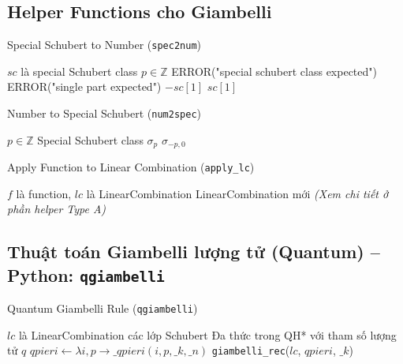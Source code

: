 \subsection*{Helper Functions cho Giambelli}

\begin{algorithm}[H]
\caption{Special Schubert to Number (\texttt{spec2num})}
\begin{algorithmic}[1]
\REQUIRE $sc$ là special Schubert class
\ENSURE $p \in \mathbb{Z}$
    \STATE ERROR("special schubert class expected")
\ENDIF
{}
    \STATE ERROR("single part expected")
\ENDIF
{}
    \RETURN $-sc[1]$
\ELSE
    \RETURN $sc[1]$
\ENDIF
\end{algorithmic}
\end{algorithm}

\begin{algorithm}[H]
\caption{Number to Special Schubert (\texttt{num2spec})}
\begin{algorithmic}[1]
\REQUIRE $p \in \mathbb{Z}$
\ENSURE Special Schubert class
    \RETURN $\sigma_p$
\ELSE
    \RETURN $\sigma_{-p,0}$
\ENDIF
\end{algorithmic}
\end{algorithm}

\begin{algorithm}[H]
\caption{Apply Function to Linear Combination (\texttt{apply\_lc})}
\begin{algorithmic}[1]
\REQUIRE $f$ là function, $lc$ là LinearCombination
\ENSURE LinearCombination mới
\STATE \textit{(Xem chi tiết ở phần helper Type A)}
\end{algorithmic}
\end{algorithm}

\subsection*{Thuật toán Giambelli lượng tử (Quantum) -- Python: \texttt{qgiambelli}}

\begin{algorithm}[H]
\caption{Quantum Giambelli Rule (\texttt{qgiambelli})}
\begin{algorithmic}[1]
\REQUIRE $lc$ là LinearCombination các lớp Schubert
\ENSURE Đa thức trong QH* với tham số lượng tử $q$
\STATE $qpieri \gets \lambda i, p \to \_qpieri(i, p, \_k, \_n)$
\RETURN \texttt{giambelli\_rec}($lc$, $qpieri$, $\_k$)
\end{algorithmic}
\end{algorithm}

